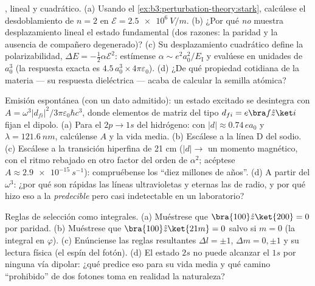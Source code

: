 \begin{exercise}[$\star\star$]\label{exo:b3:perturbation-theory:7}
, lineal y cuadrático. (a) Usando el
\cref{ex:b3:perturbation-theory:stark}, calcúlese el desdoblamiento de
$n = 2$ en $\mathcal E = \qty{2.5e6}{V/m}$. (b) ¿Por qué \emph{no} muestra
desplazamiento lineal el estado fundamental (dos razones: la paridad y la
ausencia de compañero degenerado)? (c) Su desplazamiento cuadrático define
la polarizabilidad, $\Delta E = -\tfrac12\alpha\mathcal E^2$: estímense
$\alpha \sim e^2a_0^2/E_{\text{I}}$ y evalúese en unidades de
$a_0^3$ (la respuesta exacta es $4.5\,a_0^3 \times
4\pi\varepsilon_0$). (d) ¿De qué propiedad cotidiana de la materia ---
su respuesta dieléctrica --- acaba de calcular la semilla atómica?
\end{exercise}

\begin{exercise}[$\star\star$]\label{exo:b3:perturbation-theory:8}
Emisión espontánea (con un dato admitido): un estado excitado se
desintegra con $A = \omega^3|d_{fi}|^2/3\pi\varepsilon_0\hbar c^3$,
donde elementos de matriz del tipo $d_{fi} = e\bra f\hat z\ket i$ fijan el
dipolo. (a) Para el $2p \to 1s$ del hidrógeno: con $|d| \approx 0.74\,
ea_0$ y $\lambda = \qty{121.6}{nm}$, calcúlense $A$ y la
vida media. (b) Escálese a la línea D del sodio. (c) Escálese a la
transición hiperfina de 21 cm ($|d| \to$ un momento magnético, con el ritmo
rebajado en otro factor del orden de $\alpha^2$; acéptese $A \approx
\qty{2.9e-15}{s^{-1}}$): compruébense los ``diez millones de años''. (d)
A partir del $\omega^3$: ¿por qué son rápidas las líneas ultravioletas y
eternas las de radio, y por qué hizo eso a la 
\emph{predecible} pero casi indetectable en un laboratorio?
\end{exercise}

\begin{exercise}[$\star\star$]\label{exo:b3:perturbation-theory:9}
Reglas de selección como integrales. (a) Muéstrese que $\bra{100}\hat z\ket{200} =
0$ por paridad. (b) Muéstrese que $\bra{100}\hat z\ket{21m} = 0$ salvo si $m =
0$ (la integral en $\varphi$). (c) Enúnciense las reglas resultantes $\Delta
l = \pm1$, $\Delta m = 0, \pm1$ y su lectura física (el espín del
fotón). (d) El estado $2s$ no puede alcanzar el $1s$ por ninguna vía
dipolar: ¿qué predice eso para su vida media y qué camino ``prohibido'' de
dos fotones toma en realidad la naturaleza?
\end{exercise}

